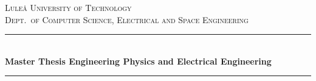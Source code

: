 \newcommand{\HRule}{\rule{\linewidth}{0.5mm}}
\center %


\textsc{\LARGE Luleå University of Technology}\\[1.5cm] %

\textsc{\Large Dept.\ of Computer Science, Electrical and Space Engineering}\\[0.5cm] %


\HRule\\[0.8cm]

{\huge\bfseries Master Thesis Engineering Physics and Electrical Engineering \project}\\[0.4cm] %

\HRule\\[1.5cm]

~

